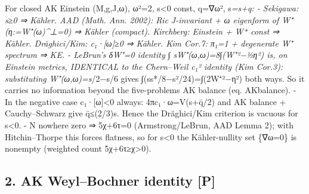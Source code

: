 \documentclass[
  10pt,
]{report}
\begin{document}
For closed AK Einstein (M,g,J,ω), \textbar ω\textbar²=2, s\textless0
const, q=\textbar∇ω\textbar², s\emph{=s+q: - Sekigawa: s≥0 ⇒ Kähler. AAD
(Math. Ann. 2002): Ric J-invariant + ω eigenform of W⁺ (η:=W⁺(ω)\^{}⊥=0)
⇒ Kähler (compact). Kirchberg: Einstein + \textbar W⁺\textbar{} const ⇒
Kähler. Drăghici/Kim: c₁·{[}ω{]}≥0 ⇒ Kähler. Kim Cor.7: π₁=1 +
degenerate W⁺ spectrum ⇒ KE. - LeBrun's δW⁺=0 identity ∫
sW⁺(ω,ω)=8∫(\textbar W⁺\textbar²−½\textbar η\textbar²) is, on Einstein
metrics, IDENTICAL to the Chern--Weil c₁² identity (Kim Cor.3):
substituting W⁺(ω,ω)=s}/2−s/6 gives
∫(ss*/8−s²/24)=∫(2\textbar W⁺\textbar²−\textbar η\textbar²) both ways.
So it carries no information beyond the five-problems AK balance (eq.
AKbalance). - In the negative case c₁·{[}ω{]}\textless0 always:
4πc₁·ω=V(s+q̄/2) and AK balance + Cauchy--Schwarz give
q̄≤(2/3)\textbar s\textbar. Hence the Drăghici/Kim criterion is vacuous
for s\textless0. - N nowhere zero ⇒ 5χ+6τ=0 (Armstrong/LeBrun, AAD Lemma
2); with Hitchin--Thorpe this forces flatness, so for s\textless0 the
Kähler-nullity set \{∇ω=0\} is nonempty (weighted count
5χ+6τ≥χ\textgreater0).

\hypertarget{ak-weylbochner-identity-p}{%
\subsection{2. AK Weyl--Bochner identity
{[}P{]}}\label{ak-weylbochner-identity-p}}
\end{document}
